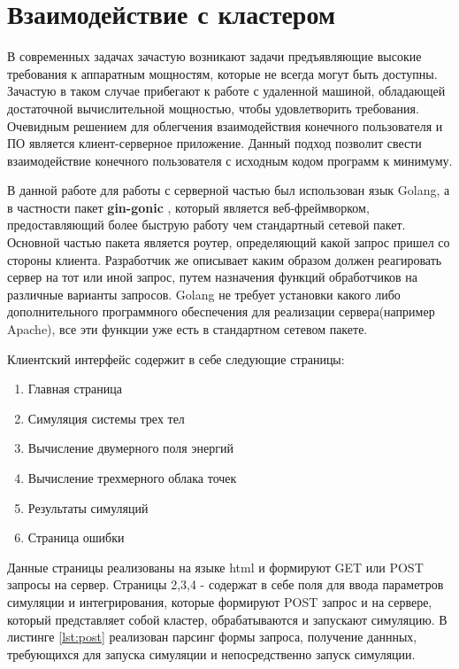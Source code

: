 \section{Взаимодействие с кластером}

В современных задачах зачастую возникают задачи предъявляющие высокие требования к аппаратным мощностям, которые не всегда
могут быть доступны. Зачастую в таком случае прибегают к работе с удаленной машиной, обладающей достаточной вычислительной мощностью,
чтобы удовлетворить требования. Очевидным решением для облегчения взаимодействия конечного пользователя и ПО является клиент-серверное
приложение. Данный подход позволит свести взаимодействие конечного пользователя с исходным кодом программ к минимуму.

В данной работе для работы с серверной частью был использован язык Golang, а в частности пакет \textbf{gin-gonic} \cite{GinGonic}, который является веб-фреймворком,
предоставляющий более быструю работу чем стандартный сетевой пакет. Основной частью пакета является роутер, определяющий
какой запрос пришел со стороны клиента. Разработчик же описывает каким образом должен реагировать сервер на тот или иной запрос, 
путем назначения функций обработчиков на различные варианты запросов. Golang не требует установки какого либо дополнительного программного обеспечения 
для реализации сервера(например Apache), все эти функции уже есть в стандартном сетевом пакете.

Клиентский интерфейс содержит в себе следующие страницы:
\begin{enumerate}
    \item Главная страница
    \item Симуляция системы трех тел
    \item Вычисление двумерного поля энергий
    \item Вычисление трехмерного облака точек
    \item Результаты симуляций
    \item Страница ошибки
\end{enumerate}

Данные страницы реализованы на языке html и формируют GET или POST запросы на сервер. Страницы 2,3,4 -  содержат в себе поля для ввода параметров симуляции 
и интегрирования, которые формируют POST запрос и на сервере, который представляет собой кластер, обрабатываются и запускают симуляцию.  В листинге \ref{lst:post}
реализован парсинг формы запроса, получение даннных, требующихся для запуска симуляции и непосредственно запуск симуляции. 


